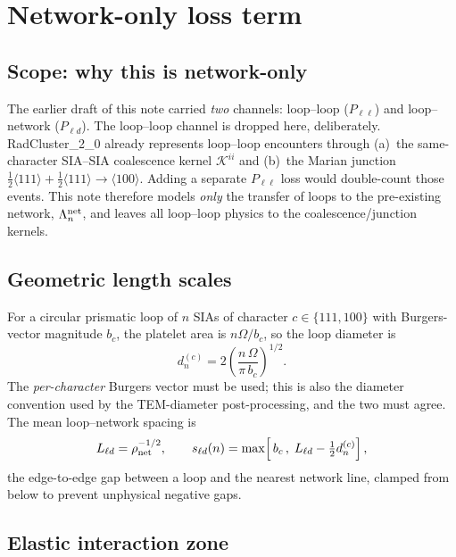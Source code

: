\documentclass[11pt,a4paper]{article}
\begin{document}
\section{Network-only loss term}
\label{sec:physics}

\subsection*{Scope: why this is network-only}

The earlier draft of this note carried \emph{two} channels: loop--loop
($P_{\ell\ell}$) and loop--network ($P_{\ell d}$).  The loop--loop channel is
dropped here, deliberately.  RadCluster\_2\_0 already represents loop--loop
encounters through (a)~the same-character SIA--SIA coalescence kernel
$\mathcal{K}^{ii}$ and (b)~the Marian junction
$\tfrac12\langle111\rangle+\tfrac12\langle111\rangle\!\to\!\langle100\rangle$.
Adding a separate $P_{\ell\ell}$ loss would double-count those events.  This
note therefore models \emph{only} the transfer of loops to the pre-existing
network, $\Lambda_n^{\rm net}$, and leaves all loop--loop physics to the
coalescence/junction kernels.

\subsection*{Geometric length scales}

For a circular prismatic loop of $n$ SIAs of character $c\in\{111,100\}$ with
Burgers-vector magnitude $b_c$, the platelet area is $n\Omega/b_c$, so the
loop diameter is
\begin{equation}
  d_n^{(c)}=2\!\left(\frac{n\,\Omega}{\pi\,b_c}\right)^{1/2}.
  \label{eq:loop_diameter_from_n}
\end{equation}
The \emph{per-character} Burgers vector must be used; this is also the diameter
convention used by the TEM-diameter post-processing, and the two must agree.
The mean loop--network spacing is
\begin{equation}
  L_{\ell d}=\rho_{\rm net}^{-1/2},\qquad
  s_{\ell d}(n)=\max\!\left[\,b_c\,,\;L_{\ell d}-\tfrac12 d_n^{(c)}\right],
  \label{eq:loop_network_spacing}
\end{equation}
the edge-to-edge gap between a loop and the nearest network line, clamped from
below to prevent unphysical negative gaps.

\subsection*{Elastic interaction zone}
\end{document}
